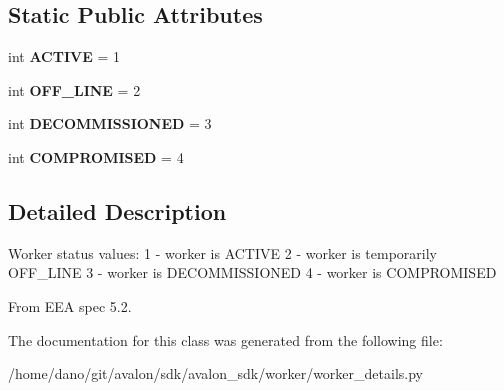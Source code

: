 \subsection*{Static Public Attributes}
\begin{DoxyCompactItemize}
\item 
\mbox{\label{classavalon__sdk_1_1worker_1_1worker__details_1_1WorkerStatus_a0b8b58c6b10d3ccc6571bc622a093a76}} 
int {\bfseries A\+C\+T\+I\+VE} = 1
\item 
\mbox{\label{classavalon__sdk_1_1worker_1_1worker__details_1_1WorkerStatus_a0dfa6b438c8f31dde3220b88a2868894}} 
int {\bfseries O\+F\+F\+\_\+\+L\+I\+NE} = 2
\item 
\mbox{\label{classavalon__sdk_1_1worker_1_1worker__details_1_1WorkerStatus_a4f0db670ecefbcb54636b67d3cafe55a}} 
int {\bfseries D\+E\+C\+O\+M\+M\+I\+S\+S\+I\+O\+N\+ED} = 3
\item 
\mbox{\label{classavalon__sdk_1_1worker_1_1worker__details_1_1WorkerStatus_aeb6009bd15dfeb17df99829faabb4860}} 
int {\bfseries C\+O\+M\+P\+R\+O\+M\+I\+S\+ED} = 4
\end{DoxyCompactItemize}


\subsection{Detailed Description}
\begin{DoxyVerb}Worker status values:
1 - worker is ACTIVE
2 - worker is temporarily OFF_LINE
3 - worker is DECOMMISSIONED
4 - worker is COMPROMISED

From EEA spec 5.2.
\end{DoxyVerb}
 

The documentation for this class was generated from the following file\+:\begin{DoxyCompactItemize}
\item 
/home/dano/git/avalon/sdk/avalon\+\_\+sdk/worker/worker\+\_\+details.\+py\end{DoxyCompactItemize}
